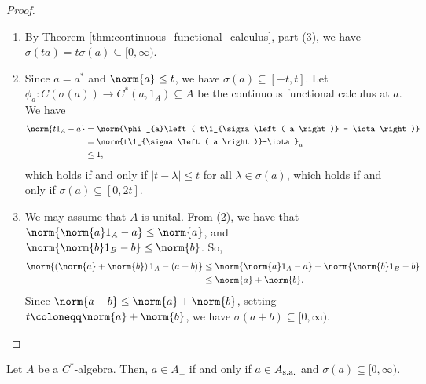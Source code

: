 \begin{proof}\hfill
  \begin{enumerate}[(1)]
    \item By Theorem \ref{thm:continuous_functional_calculus}, part (3), we have $\sigma\left( ta \right) = t\sigma\left( a \right)\subseteq [0,\infty)$.
    \item Since $a = a^{\ast}$ and $\norm{a}\leq t$, we have $\sigma\left( a \right)\subseteq [-t,t]$. Let $\phi_a\colon C\left( \sigma\left( a \right) \right)\rightarrow C^{\ast}\left( a,1_A \right)\subseteq A$ be the continuous functional calculus at $a$. We have
      \begin{align*}
        \norm{t1_A - a} &= \norm{\phi_{a}\left( t\1_{\sigma\left( a \right)} - \iota \right)}\\
                        &= \norm{t\1_{\sigma\left( a \right)}-\iota}_{u}\\
                        &\leq 1,
      \end{align*}
      which holds if and only if $\left\vert t - \lambda \right\vert \leq t$ for all $\lambda\in \sigma\left( a \right)$, which holds if and only if $\sigma\left( a \right)\subseteq [0,2t]$.
    \item We may assume that $A$ is unital. From (2), we have that $\norm{\norm{a}1_A - a}\leq \norm{a}$, and $\norm{\norm{b}1_B - b}\leq \norm{b}$. So,
      \begin{align*}
        \norm{\left( \norm{a} + \norm{b} \right)1_A - \left( a+b \right)} &\leq \norm{\norm{a}1_A-a} + \norm{\norm{b}1_B - b}\\
                                                                          &\leq \norm{a} + \norm{b}.
      \end{align*}
      Since $\norm{a +b}\leq \norm{a} + \norm{b}$, setting $t \coloneq \norm{a} + \norm{b}$, we have $\sigma\left( a + b \right)\subseteq [0,\infty)$.
  \end{enumerate}
\end{proof}
\begin{theorem}
  Let $A$ be a $C^{\ast}$-algebra. Then, $a\in A_{+}$ if and only if $a\in A_{\operatorname{s.a.}}$ and $\sigma\left( a \right)\subseteq [0,\infty)$.
\end{theorem}

